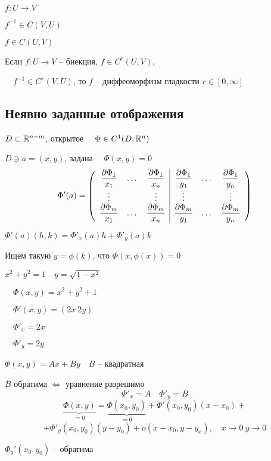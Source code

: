     $ $
    \par $f : U \rightarrow V$
    \par $f^{-1} \in C(V, U)$
    \par $f \in C(U, V)$

    \begin{definition}
        Если $f : U \rightarrow V$ -- биекция, $f \in C^r(U, V)$,
        \par $\quad f^{-1} \in C^r(V, U)$, то $f$ -- диффеоморфизм гладкости $r \in [0, \infty]$
    \end{definition}

    \subsection*{Неявно заданные отображения}

    $D \subset \mathbb{R}^{n+m}$, открытое $\quad \Phi \in C^1(D, \mathbb{R}^n)$
    \par $D \ni a = (x, y)$, задана $\quad \Phi(x, y) = 0$
    \[
        \Phi'(a) = \left(\begin{array}{c c c | c c c}
            \dfrac{\partial \Phi_1}{x_1} & \dots & \dfrac{\partial \Phi_1}{x_n} & \dfrac{\partial \Phi_1}{y_1} & \dots & \dfrac{\partial \Phi_1}{y_n} \\
            \vdots & & \vdots & \vdots & & \vdots \\
            \dfrac{\partial \Phi_m}{x_1} & \dots & \dfrac{\partial \Phi_m}{x_n} & \dfrac{\partial \Phi_m}{y_1} & \dots & \dfrac{\partial \Phi_m}{y_n} \\
        \end{array}\right)
    \]

    \par $\Phi'(a)(h, k) = \Phi'_x(a)h + \Phi'_y(a)k$
    \par Ищем такую $y = \phi(k)$, что $\Phi(x, \phi(x)) = 0$

    \pagebreak

    \begin{illustration}
        $x^2 + y^2 = 1 \quad y = \sqrt{1 - x^2}$
        \par $\quad \Phi(x, y) = x^2 + y^2 + 1$
        \par $\quad \Phi'(x, y) = (2x \ 2y)$
        \par $\quad \Phi'_x = 2x$
        \par $\quad \Phi'_y = 2y$
    \end{illustration}

    \begin{illustration}
        $\Phi(x, y) = Ax + By \quad B$ -- квадратная
        \par \quad $B$ обратима $\Leftrightarrow$ уравнение разрешимо
        \[
            \Phi'_x = A \quad \Phi'_y = B    
        \]
        \[
            \underbrace{\Phi(x, y)}_{=0} = \underbrace{\Phi(x_0, y_0)}_{=0} + \Phi'(x_0, y_0)(x - x_0) +    
        \]
        \[
            + \Phi'_y(x_0, y_0)(y - y_0) + o(x-x_0, y-y_x), \quad x \rightarrow 0 \ y \rightarrow 0    
        \]
        \par $\Phi_y'(x_0, y_0)$ -- обратима
    \end{illustration}


